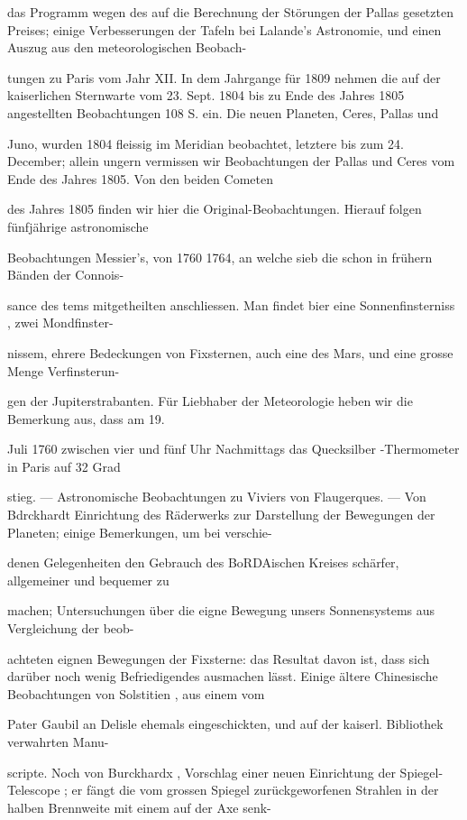 \documentclass[10pt,a4paper]{article}
\begin{document}
das Programm wegen des auf die Berechnung der Störungen der Pallas gesetzten Preises; einige Verbesserungen der Tafeln bei Lalande's Astronomie, und einen Auszug aus den meteorologischen Beobach-

tungen zu Paris vom Jahr XII. In dem Jahrgange für 1809 nehmen die auf der kaiserlichen Sternwarte vom 23. Sept. 1804 bis zu Ende des Jahres 1805 angestellten Beobachtungen 108 S. ein. Die neuen Planeten, Ceres, Pallas und

Juno, wurden 1804 fleissig im Meridian beobachtet, letztere bis zum 24. December; allein ungern vermissen wir Beobachtungen der Pallas und Ceres vom Ende des Jahres 1805. Von den beiden Cometen

des Jahres 1805 finden wir hier die Original-Beobachtungen. Hierauf folgen fünfjährige astronomische

Beobachtungen Messier's, von 1760 1764, an welche sieb die schon in frühern Bänden der Connois-

sance des tems mitgetheilten anschliessen. Man findet bier eine Sonnenfinsterniss , zwei Mondfinster-

nissem, ehrere Bedeckungen von Fixsternen, auch eine des Mars, und eine grosse Menge Verfinsterun-

gen der Jupiterstrabanten. Für Liebhaber der Meteorologie heben wir die Bemerkung aus, dass am 19.

Juli 1760 zwischen vier und fünf Uhr Nachmittags das Quecksilber -Thermometer in Paris auf 32 Grad

stieg. — Astronomische Beobachtungen zu Viviers von Flaugerques. — Von Bdrckhardt Einrichtung des Räderwerks zur Darstellung der Bewegungen der Planeten; einige Bemerkungen, um bei verschie-

denen Gelegenheiten den Gebrauch des BoRDAischen Kreises schärfer, allgemeiner und bequemer zu

machen; Untersuchungen über die eigne Bewegung unsers Sonnensystems aus Vergleichung der beob-

achteten eignen Bewegungen der Fixsterne: das Resultat davon ist, dass sich darüber noch wenig Befriedigendes ausmachen lässt. Einige ältere Chinesische Beobachtungen von Solstitien , aus einem vom

Pater Gaubil an Delisle ehemals eingeschickten, und auf der kaiserl. Bibliothek verwahrten Manu-

scripte. Noch von Burckhardx , Vorschlag einer neuen Einrichtung der Spiegel-Telescope ; er fängt die vom grossen Spiegel zurückgeworfenen Strahlen in der halben Brennweite mit einem auf der Axe senk-
\end{document}
